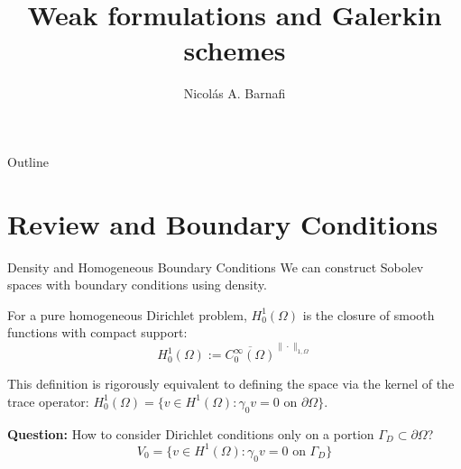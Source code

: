 \documentclass[aspectratio=169]{beamer}
\title[Traces and Poincar\'e]{Weak formulations and Galerkin schemes}
\author{Nicol\'as A. Barnafi}
\date{}
\begin{document}
\begin{frame}
    \titlepage
\end{frame}

\begin{frame}{Outline}
    \tableofcontents
\end{frame}

\section{Review and Boundary Conditions}

\begin{frame}{Density and Homogeneous Boundary Conditions}
    We can construct Sobolev spaces with boundary conditions using density.

    \vspace{0.3cm}
    For a pure homogeneous Dirichlet problem, $H^1_0(\Omega)$ is the closure of smooth functions with compact support:
    $$ H^1_0(\Omega) := \overline{C_0^\infty(\Omega)}^{\|\cdot\|_{1,\Omega}} $$

    This definition is rigorously equivalent to defining the space via the kernel of the trace operator: $H^1_0(\Omega) = \{v \in H^1(\Omega) : \gamma_0 v = 0 \text{ on } \partial\Omega\}$.

    \vspace{0.3cm}
    \textbf{Question:} How to consider Dirichlet conditions only on a portion $\Gamma_D \subset \partial\Omega$?
    $$ V_0 = \{ v \in H^1(\Omega) : \gamma_0 v = 0 \text{ on } \Gamma_D \} $$
\end{frame}
\end{document}
